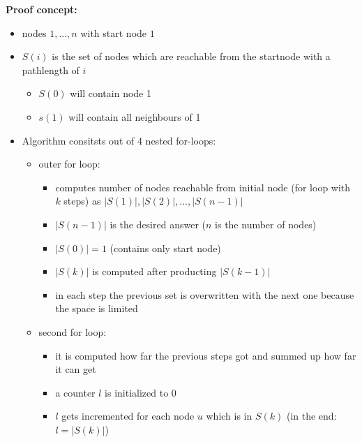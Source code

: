 \documentclass[a4]{scrartcl}
\begin{document}
\textbf{Proof concept:}
\begin{itemize}
\item nodes $1,...,n$ with start node $1$
\item $S(i)$ is the set of nodes which are reachable from the startnode with a pathlength of $i$
\begin{itemize}
\item $S(0)$ will contain node 1
\item $s(1)$ will contain all neighbours of 1
\end{itemize}

\item Algorithm consitsts out of 4 nested for-loops:

\begin{itemize}
\item outer for loop:
\begin{itemize}
\item computes number of nodes reachable from initial node (for loop with $k$ steps) as $|S(1)|, |S(2)|, ..., |S(n-1)|$
\item $|S(n-1)|$ is the desired answer ($n$ is the number of nodes)
\item $|S(0)| = 1$ (contains only start node)
\item $|S(k)|$ is computed after producting $|S(k-1)|$
\item in each step the previous set is overwritten with the next one because the space is limited
\end{itemize}

\item second for loop:
\begin{itemize}
\item it is computed how far the previous steps got and summed up how far it can get
\item a counter $l$ is initialized to 0
\item $l$ gets incremented for each node $u$ which is in $S(k)$ (in the end: $l = |S(k)|$)
\end{itemize}


\end{itemize}
\end{itemize}
\end{document}
